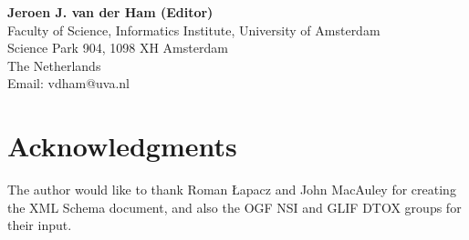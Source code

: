\documentclass[12pt]{article}  %
\begin{document}
% 
% 
% 

\textbf{Jeroen J. van der Ham (Editor)} \\
Faculty of Science, Informatics Institute, University of Amsterdam \\
Science Park 904, 1098 XH  Amsterdam  \\
The Netherlands \\
Email: vdham@uva.nl \\
\section{Acknowledgments}

The author would like to thank Roman Łapacz and John MacAuley for creating the XML Schema document, and also the OGF NSI and GLIF DTOX groups for their input.


 
 

\pagebreak
\appendix
	
	
\end{document}
